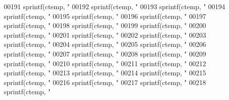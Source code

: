 \begin{DoxyCode}
{{{{{{{{{{{{{{{{{{{{{{{{{{{{{{{{{{{{{{{{{{{{{{{{{{{00191     sprintf(ctemp, \textcolor{stringliteral}{"%
00192     sprintf(ctemp, \textcolor{stringliteral}{"%
00193     sprintf(ctemp, \textcolor{stringliteral}{"%
00194     sprintf(ctemp, \textcolor{stringliteral}{"%
00195     sprintf(ctemp, \textcolor{stringliteral}{"%
00196     sprintf(ctemp, \textcolor{stringliteral}{"%
00197     sprintf(ctemp, \textcolor{stringliteral}{"%
00198     sprintf(ctemp, \textcolor{stringliteral}{"%
00199     sprintf(ctemp, \textcolor{stringliteral}{"%
00200     sprintf(ctemp, \textcolor{stringliteral}{"%
00201     sprintf(ctemp, \textcolor{stringliteral}{"%
00202     sprintf(ctemp, \textcolor{stringliteral}{"%
00203     sprintf(ctemp, \textcolor{stringliteral}{"%
00204     sprintf(ctemp, \textcolor{stringliteral}{"%
00205     sprintf(ctemp, \textcolor{stringliteral}{"%
00206     sprintf(ctemp, \textcolor{stringliteral}{"%
00207     sprintf(ctemp, \textcolor{stringliteral}{"%
00208     sprintf(ctemp, \textcolor{stringliteral}{"%
00209     sprintf(ctemp, \textcolor{stringliteral}{"%
00210     sprintf(ctemp, \textcolor{stringliteral}{"%
00211     sprintf(ctemp, \textcolor{stringliteral}{"%
00212     sprintf(ctemp, \textcolor{stringliteral}{"%
00213     sprintf(ctemp, \textcolor{stringliteral}{"%
00214     sprintf(ctemp, \textcolor{stringliteral}{"%
00215     sprintf(ctemp, \textcolor{stringliteral}{"%
00216     sprintf(ctemp, \textcolor{stringliteral}{"%
00217     sprintf(ctemp, \textcolor{stringliteral}{"%
00218     sprintf(ctemp, \textcolor{stringliteral}{"%
}}}}}}}}}}}}}}}}}}}}}}}}}}}}}}}}}}}}}}}}}}}}}}}}}}}}}}}}}}}}}}}}}}}}}}}}}}}}}}}
\end{DoxyCode}
